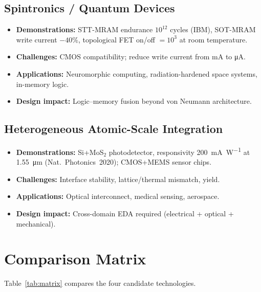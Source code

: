 \documentclass[conference]{IEEEtran}
\begin{document}
\subsection{Spintronics / Quantum Devices}
\begin{itemize}
  \item \textbf{Demonstrations:} STT-MRAM endurance $10^{12}$ cycles (IBM), SOT-MRAM write current $-40\%$, topological FET on/off $=10^3$ at room temperature.
  \item \textbf{Challenges:} CMOS compatibility; reduce write current from mA to \si{\micro\ampere}.
  \item \textbf{Applications:} Neuromorphic computing, radiation-hardened space systems, in-memory logic.
  \item \textbf{Design impact:} Logic–memory fusion beyond von Neumann architecture.
\end{itemize}

\subsection{Heterogeneous Atomic-Scale Integration}
\begin{itemize}
  \item \textbf{Demonstrations:} Si+MoS$_2$ photodetector, responsivity \SI{200}{\milli\ampere\per\watt} at \SI{1.55}{\micro\meter} (Nat.~Photonics~2020); CMOS+MEMS sensor chips.
  \item \textbf{Challenges:} Interface stability, lattice/thermal mismatch, yield.
  \item \textbf{Applications:} Optical interconnect, medical sensing, aerospace.
  \item \textbf{Design impact:} Cross-domain EDA required (electrical + optical + mechanical).
\end{itemize}

\section{Comparison Matrix}
Table~\ref{tab:matrix} compares the four candidate technologies.
\end{document}
